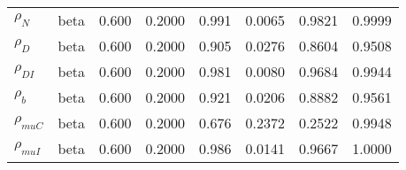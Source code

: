 \begin{center}
\begin{longtable}{llcccccc}
${\rho_N}$ & beta &   0.600 & 0.2000 &   0.991& 0.0065 &  0.9821 &  0.9999 \\ 
${\rho_D}$ & beta &   0.600 & 0.2000 &   0.905& 0.0276 &  0.8604 &  0.9508 \\ 
${\rho_{DI}}$ & beta &   0.600 & 0.2000 &   0.981& 0.0080 &  0.9684 &  0.9944 \\ 
${\rho_b}$ & beta &   0.600 & 0.2000 &   0.921& 0.0206 &  0.8882 &  0.9561 \\ 
${\rho_{muC}}$ & beta &   0.600 & 0.2000 &   0.676& 0.2372 &  0.2522 &  0.9948 \\ 
${\rho_{muI}}$ & beta &   0.600 & 0.2000 &   0.986& 0.0141 &  0.9667 &  1.0000 \\ 
\end{longtable}
 \end{center}
